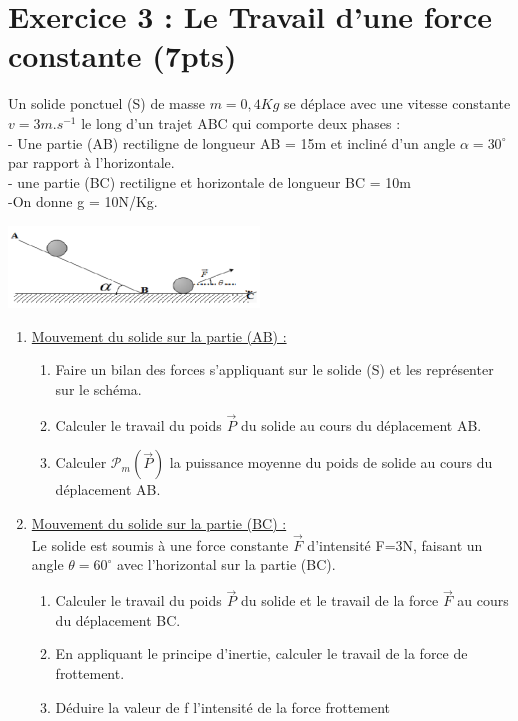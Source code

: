 \documentclass[12pt]{article}
\begin{document}
\section*{Exercice 3 : Le Travail d'une force constante (7pts)}
Un solide ponctuel (S) de masse $m = 0,4 Kg$ se
déplace avec une vitesse constante $v = 3 m.s^{-1}$ le long
d’un trajet ABC qui comporte deux phases :
\\- Une partie (AB) rectiligne de longueur AB = 15m
et incliné d’un angle $\alpha= 30^{\circ}$ par rapport à l’horizontale.
\\- une partie (BC) rectiligne et horizontale de
longueur BC = 10m 
\\-On donne g = 10N/Kg.
  \begin{center}
    \includegraphics[width=0.5\textwidth]{./img/imgre00.png}
  \end{center}



\begin{enumerate}
    \item \underline{Mouvement du solide sur la partie (AB) :}
        \begin{enumerate}
                \item Faire un bilan des forces s’appliquant sur le solide (S) et les représenter sur le schéma.
                \item Calculer le travail du poids $\vec{P}$ du solide au cours du déplacement AB.
                \item  Calculer $\mathscr{P}_m(\vec{P})$ la puissance moyenne du poids de solide au cours du déplacement AB.
        \end{enumerate}
    \item \underline{Mouvement du solide sur la partie (BC) :}\\
Le solide est soumis à une force constante $\vec{F}$ d’intensité F=3N, faisant un angle $\theta = 60^{\circ}$ avec l’horizontal sur
la partie (BC).
        \begin{enumerate}
                
                \item Calculer le travail du poids $\vec{P}$ du solide et le travail de la force   $\vec{F}$ au cours du déplacement BC.
                    \item En appliquant le principe d’inertie, calculer le travail de la force de frottement.
                        \item Déduire la valeur de f l’intensité de la force frottement
        \end{enumerate}
\end{enumerate}
\end{document}

